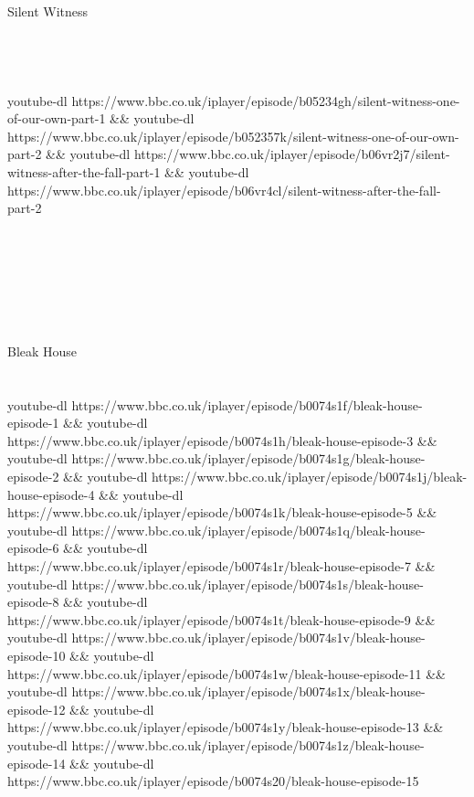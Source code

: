\documentclass[10pt,a4paper]{article}
\begin{document}
{{{{{{{{{{{{{{{{{{{{{{{{\\
Silent Witness\\
\\
\\
\\
\\
youtube-dl https://www.bbc.co.uk/iplayer/episode/b05234gh/silent-witness-one-of-our-own-part-1 \&\& youtube-dl https://www.bbc.co.uk/iplayer/episode/b052357k/silent-witness-one-of-our-own-part-2 \&\& youtube-dl https://www.bbc.co.uk/iplayer/episode/b06vr2j7/silent-witness-after-the-fall-part-1 \&\& youtube-dl https://www.bbc.co.uk/iplayer/episode/b06vr4cl/silent-witness-after-the-fall-part-2 \\
\\
\\
\\
\\
\\
\\
\\
Bleak House\\
\\
\\
youtube-dl https://www.bbc.co.uk/iplayer/episode/b0074s1f/bleak-house-episode-1 \&\& youtube-dl https://www.bbc.co.uk/iplayer/episode/b0074s1h/bleak-house-episode-3 \&\& youtube-dl https://www.bbc.co.uk/iplayer/episode/b0074s1g/bleak-house-episode-2 \&\& youtube-dl https://www.bbc.co.uk/iplayer/episode/b0074s1j/bleak-house-episode-4 \&\& youtube-dl https://www.bbc.co.uk/iplayer/episode/b0074s1k/bleak-house-episode-5 \&\& youtube-dl https://www.bbc.co.uk/iplayer/episode/b0074s1q/bleak-house-episode-6 \&\& youtube-dl https://www.bbc.co.uk/iplayer/episode/b0074s1r/bleak-house-episode-7 \&\& youtube-dl https://www.bbc.co.uk/iplayer/episode/b0074s1s/bleak-house-episode-8 \&\& youtube-dl https://www.bbc.co.uk/iplayer/episode/b0074s1t/bleak-house-episode-9 \&\& youtube-dl https://www.bbc.co.uk/iplayer/episode/b0074s1v/bleak-house-episode-10 \&\& youtube-dl https://www.bbc.co.uk/iplayer/episode/b0074s1w/bleak-house-episode-11 \&\& youtube-dl https://www.bbc.co.uk/iplayer/episode/b0074s1x/bleak-house-episode-12 \&\& youtube-dl https://www.bbc.co.uk/iplayer/episode/b0074s1y/bleak-house-episode-13 \&\& youtube-dl https://www.bbc.co.uk/iplayer/episode/b0074s1z/bleak-house-episode-14 \&\& youtube-dl https://www.bbc.co.uk/iplayer/episode/b0074s20/bleak-house-episode-15\\
\\
\\
\\
\\
}}}}}}}}}}}}}}}}}}}}}}}}
\end{document}
